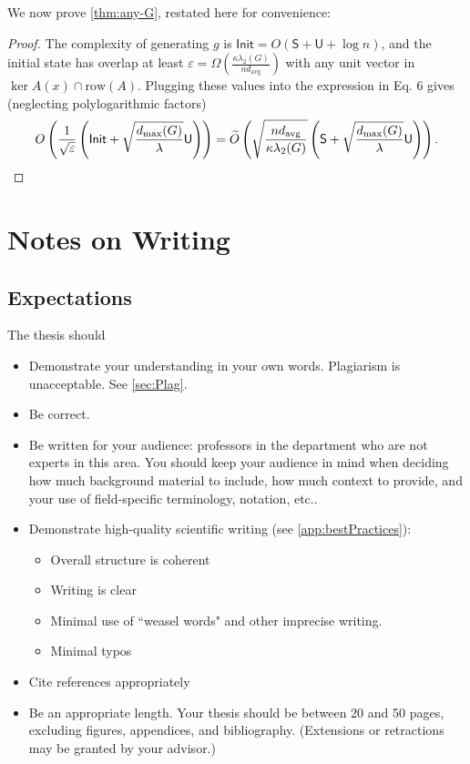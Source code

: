 \documentclass[midd]{thesis}
\begin{document}
We now prove \cref{thm:any-G}, restated here for convenience:
\anyG*
\begin{proof}
The complexity of generating $g$ is $\mathsf{Init}=O(\mathsf{S}+\mathsf{U}+\log n)$, and the initial state has overlap at least $\varepsilon = \Omega\left(\frac{\kappa\lambda_2(G)}{nd_{\mathrm{avg}}}\right)$ with any unit vector in $\ker A(x)\cap \mathrm{row}(A)$. Plugging these values into the expression in Eq. 6 gives (neglecting polylogarithmic factors)
\begin{equation*}
O\left(\frac{1}{\sqrt{\varepsilon}}\left(\mathsf{Init}+\sqrt{\frac{d_{\max}(G)}{\lambda}}\mathsf{U}\right)\right)
=\widetilde{O}\left(\sqrt{\frac{nd_{\mathrm{avg}}}{\kappa\lambda_2(G)}}\left(\mathsf{S}+\sqrt{\frac{d_{\max}(G)}{\lambda}}\mathsf{U}\right)\right).\qedhere
\end{equation*}
\end{proof}

\chapter{Notes on Writing}
\label{app:writing}

\section{Expectations}
\label{sec:thesis_expectations}
The thesis should
\begin{itemize}
    \item Demonstrate your understanding in your own words. Plagiarism is unacceptable. See \cref{sec:Plag}. 
    \item Be correct.
    \item Be written for your audience: professors in the department who are not experts in this area. You should keep your audience in mind when deciding how much background material to include, how much context to provide, and your use of field-specific terminology, notation, etc..
    \item Demonstrate high-quality scientific writing (see \cref{app:bestPractices}):
    \begin{itemize}
        \item Overall structure is coherent
        \item Writing is clear
        \item Minimal use of ``weasel words" and other imprecise writing. 
        \item Minimal typos
    \end{itemize}
    \item Cite references appropriately
    \item Be an appropriate length. Your thesis should be between 20 and 50 pages, excluding figures, appendices, and bibliography. (Extensions or retractions may be granted by your advisor.)
\end{itemize}
\end{document}
